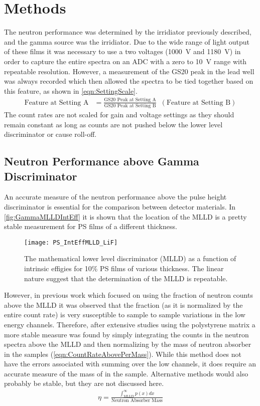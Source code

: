 \section{Methods}
The neutron performance was determined by the  irridiator previously described, and the gamma source was the  irridiator.
Due to the wide range of light output of these films it was necessary to use a two voltages (\SI{1000}{\volt} and \SI{1180}{\volt}) in order to capture the entire spectra on an ADC with a zero to \SI{10}{\volt} range with repeatable resolution.
However, a measurement of the GS20 peak in the lead well was always recorded which then allowed the spectra to be tied together based on this feature, as shown in \autoref{eqn:SettingScale}.
\begin{align}
  \label{eqn:SettingScale}
  \text{Feature at Setting A} &= \frac{\text{GS20 Peak at Setting A}}{\text{GS20 Peak at Setting B}} \;\; \left( \text{Feature at Setting B}\right)
\end{align}
The count rates are not scaled for gain and voltage settings as they should remain constant as long as counts are not pushed below the lower level discriminator or cause roll-off.
\subsection{Neutron Performance above Gamma Discriminator}
An accurate measure of the neutron performance above the pulse height discriminator is essential for the comparison between detector materials.
In \autoref{fig:GammaMLLDIntEff} it is shown that the location of the MLLD is a pretty stable measurement for PS films of a different thickness.
\begin{figure}
  \centering
  \texttt{[image: PS\_IntEffMLLD\_LiF]}
  \caption[Stability of Lower Level Discriminator]{The mathematical lower level discriminator (MLLD) as a function of intrinsic effigies for 10\% PS films of various thickness. The linear nature suggest that the determination of the MLLD is repeatable.}
  \label{fig:GammaMLLDIntEff}
\end{figure}
However, in previous work which focused on using the fraction of neutron counts above the MLLD it was observed that the fraction (as it is normalized by the entire count rate) is very susceptible to sample to sample variations in the low energy channels.
Therefore, after extensive studies using the polystyrene matrix a more stable measure was found by simply integrating the counts in the neutron spectra above the MLLD and then normalizing by the mass of neutron absorber in the samples (\autoref{eqn:CountRateAbovePerMass}).
While this method does not have the errors associated with summing over the low channels, it does require an accurate measure of the mass of  in the sample.
Alternative methods would also probably be stable, but they are not discussed here.
\begin{align}
\label{eqn:CountRateAbovePerMass}
\eta = \frac{\int_{\text{MLLD}}^\infty p(x)dx}{\text{Neutron Absorber Mass}}
\end{align}

